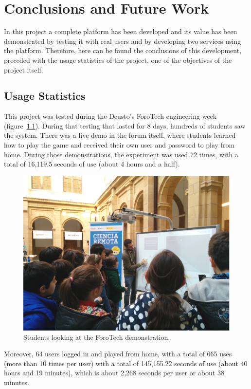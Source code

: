 \chapter{Conclusions and Future Work}

In this project a complete platform has been developed and its value has been demonstrated by
testing it with real users and by developing two services using the platform. Therefore, here can be
found the conclusions of this development, preceded with the usage statistics of the project, one of
the objectives of the project itself.

\section{Usage Statistics}

This project was tested during the Deusto's ForoTech engineering week (figure~\ref{fig:forotech}).
During that testing that lasted for 8 days, hundreds of students saw the system. There was a live
demo in the forum itself, where students learned how to play the game and received their own user
and password to play from home. During those demonstrations, the experiment was used 72 times, with
a total of 16,119.5 seconds of use (about 4 hours and a half).

\begin{figure}[ht]
	\centering
	\includegraphics[height=0.3\textheight]{fig/forotech}
	\caption{Students looking at the ForoTech demonstration.}
	\label{fig:forotech}
\end{figure}

Moreover, 64 users logged in and played from home, with a total of 665 uses (more than 10 times per
user) with a total of 145,155.22 seconds of use (about 40 hours and 19 minutes), which is about
2,268 seconds per user or about 38 minutes.

